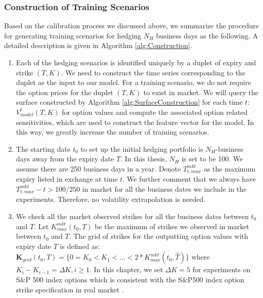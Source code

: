 \subsubsection{Construction of Training Scenarios}
Based on the calibration process we discussed above, we summarize the procedure for generating training scenarios for hedging $N_H$ business days as the following. A detailed description is given in Algorithm \ref{alg:Construction}.
\begin{enumerate}
	\item Each of the hedging scenarios is identified uniquely by a duplet of expiry and strike  $(T,K)$. We need to construct the time series corresponding to the duplet as the input to our model. For a training scenario, we do not require the option prices for the  duplet $(T,K)$ to exist in market. We will query the surface constructed by Algorithm \ref{alg:SurfaceConstruction} for each time $t$: $V_{model}^t(T,K)$ for option values and compute the associated option related sensitivities, which are used to construct the feature vector for the model. In this way, we greatly increase the number of training scenarios.  
	\item The starting date $t_0$ to set up the initial hedging portfolio is  $N_H$-business days away from the expiry date $T$. In this thesis,  $N_H$ is set to be 100.  We assume there are 250 business days in a year. Denote $T_{t,max}^{mkt}$ as the maximum expiry listed in exchange at time $t$. We further comment that we always have $T_{t,max}^{mkt}-t>100/250$ in market for all the business dates we include in the experiments.  Therefore, no volatility extrapolation is needed.
	\item We check all the market observed strikes for all the business dates between $t_0$ and  $T$. Let $K^{mkt}_{max}(t_0,T)$ be the maximum of  strikes we observed in market  between $t_0$ and  $T$. The grid of strikes for the outputting option values with expiry date $T$ is defined as: $\mathbf{K}_{grid}(t_0,{T})=\{0=K_0<K_1<\dots<2*K^{mkt}_{max}(t_0,\widehat{T})\}$ where $K_i-K_{i-1}=\Delta K, i \geq 1$. In this chapter, we set $\Delta K=5$ for experiments on S\&P 500 index options which is consistent with the S\&P500 index option strike specification in real market \cite{hull2006options}.
\end{enumerate}

